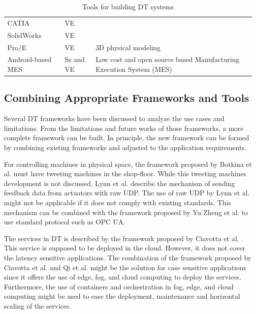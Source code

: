 \documentclass[article,table]{aaltoseries}
\begin{document}
\begin{table}[]
\begin{tabular}{|p{3.8cm}|p{1.5cm}|p{5.8cm}|}
		CATIA                                                        & VE             &                                                                                         \\ \cline{1-2}
		SolidWorks                                                   & VE             &                                                                                         \\ \cline{1-2}
		Pro/E                                                        & VE             & \multirow{-3}{*}{3D physical modeling}                                                  \\ \hline
		Android-based MES \cite{UrbinaCoronado2018} & Ss and VE      & Low cost and open source based Manufacturing Execution System (MES)                     \\ \hline
	\end{tabular}
	\caption{Tools for building DT systems}
	\label{tab:table_tools}
\end{table}

\subsection{Combining Appropriate Frameworks and Tools}
Several DT frameworks have been discussed to analyze the use cases and limitations. From the limitations and future works of those frameworks, a more complete framework can be built. In principle, the new framework can be formed by combining existing frameworks and adjusted to the application requirements.

For controlling machines in physical space, the framework proposed by Botkina et al. \cite{botkina2018digital} must have tweeting machines in the shop-floor. While this tweeting machines development is not discussed, Lynn et al. \cite{lynn2018realization} describe the mechanism of sending feedback data from actuators with raw UDP. The use of raw UDP by Lynn et al. might not be applicable if it does not comply with existing standards. This mechanism can be combined with the framework proposed by Yu Zheng et al. \cite{zheng2019application} to use standard protocol such as OPC UA.

The services in DT is described by the framework proposed by Ciavotta et al. \cite{ciavotta2017microservice}. This service is supposed to be deployed in the cloud. However, it does not cover the latency sensitive applications. The combination of the framework proposed by Ciavotta et al. and Qi et al. \cite{qi2018modeling} might be the solution for case sensitive applications since it offers the use of edge, fog, and cloud computing to deploy the services. Furthermore, the use of containers and orchestration in fog, edge, and cloud computing might be used to ease the deployment, maintenance and horizontal scaling of the services. 
\end{document}

